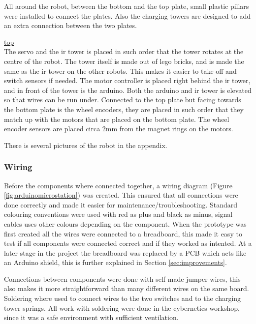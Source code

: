 All around the robot, between the bottom and the top plate, small plastic pillars were installed to connect the plates. Also the charging towers are designed to add an extra connection between the two plates.

\underline{top}
\\
The servo and the \acrshort{ir} tower is placed in such order that the tower rotates at the centre of the robot. The tower itself is made out of lego bricks, and is made the same as the \acrshort{ir} tower on the other robots. This makes it easier to take off and switch sensors if needed. The motor controller is placed right behind the \acrshort{ir} tower, and in front of the tower is the arduino. Both the arduino and \acrshort{ir} tower is elevated so that wires can be run under. Connected to the top plate but facing towards the bottom plate is the wheel encoders, they are placed in such order that they match up with the motors that are placed on the bottom plate. The wheel encoder sensors are placed circa 2mm from the magnet rings on the motors.

There is several pictures of the robot in the appendix.

\subsubsection{Wiring}
Before the components where connected together, a wiring diagram (Figure \ref{fig:arduinomicrostation}) was created. This ensured that all connections were done correctly and made it easier for maintenance/troubleshooting. Standard colouring conventions were used with red as plus and black as minus, signal cables uses other colours depending on the component. When the prototype was first created all the wires were connected to a breadboard, this made it easy to test if all components were connected correct and if they worked as intented. At a later stage in the project the breadboard was replaced by a PCB which acts like an Arduino shield, this is further explained in Section \ref{sec:improvements}.

Connections between components were done with self-made jumper wires, this also makes it more straightforward than many different wires on the same board. Soldering where used to connect wires to the two switches and to the charging tower springs. All work with soldering were done in the cybernetics workshop, since it was a safe environment with sufficient ventilation.